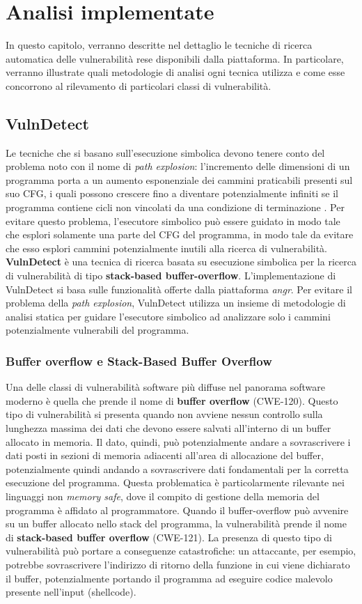 \documentclass[../main.tex]{subfiles}
\begin{document}
\chapter{Analisi implementate}
In questo capitolo, verranno descritte nel dettaglio le tecniche di ricerca automatica delle vulnerabilità rese disponibili dalla piattaforma.
In particolare, verranno illustrate quali metodologie di analisi ogni tecnica utilizza e come esse concorrono al rilevamento
di particolari classi di vulnerabilità.
\section{VulnDetect}
Le tecniche che si basano sull'esecuzione simbolica devono tenere conto del problema noto con il nome di \textit{path explosion}: l'incremento delle
dimensioni di un programma porta a un aumento esponenziale dei cammini praticabili presenti sul suo CFG, i quali possono crescere fino a diventare
potenzialmente infiniti se il programma contiene cicli non vincolati da una condizione di terminazione \cite{SE_Path_explosion}. 
Per evitare questo problema, l'esecutore simbolico può essere guidato in modo tale che esplori solamente una parte del CFG del programma, in modo tale da evitare che esso
esplori cammini potenzialmente inutili alla ricerca di vulnerabilità. \textbf{VulnDetect} \cite{VulnDetect} è una tecnica di ricerca basata su esecuzione simbolica per la ricerca
di vulnerabilità di tipo \textbf{stack-based buffer-overflow}. L'implementazione di VulnDetect si basa sulle funzionalità offerte dalla piattaforma \textit{angr}.
Per evitare il problema della \textit{path explosion}, VulnDetect utilizza un insieme di metodologie di analisi statica per guidare
l'esecutore simbolico ad analizzare solo i cammini potenzialmente vulnerabili del programma.
\subsection{Buffer overflow e Stack-Based Buffer Overflow}
Una delle classi di vulnerabilità software più diffuse nel panorama software moderno è quella che prende il nome di \textbf{buffer overflow} (CWE-120).
Questo tipo di vulnerabilità si presenta quando non avviene nessun controllo sulla lunghezza massima dei dati che devono essere salvati all'interno
di un buffer allocato in memoria. Il dato, quindi, può potenzialmente andare a sovrascrivere i dati posti in sezioni di memoria adiacenti all'area di allocazione
del buffer, potenzialmente quindi andando a sovrascrivere dati fondamentali per la corretta esecuzione del programma. 
Questa problematica è particolarmente rilevante nei linguaggi non \textit{memory safe}, dove il compito di gestione della memoria del programma è affidato
al programmatore. Quando il buffer-overflow può avvenire su un buffer allocato nello stack del programma, la vulnerabilità prende il nome di \textbf{stack-based buffer overflow} (CWE-121).
La presenza di questo tipo di vulnerabilità può portare a conseguenze catastrofiche: un attaccante, per esempio, potrebbe sovrascrivere l'indirizzo di ritorno della funzione in cui viene dichiarato il buffer, 
potenzialmente portando il programma ad eseguire codice malevolo presente nell'input (shellcode).
\end{document}
